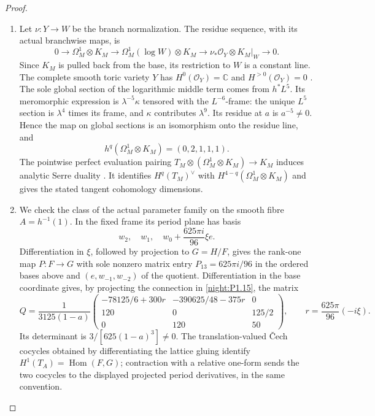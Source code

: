 \documentclass[11pt,a4paper]{article}
\theoremstyle{definition}
\begin{document}
\begin{proof}
\begin{enumerate}[label=\arabic*.]
\item Let $\nu:Y\to W$ be the branch normalization.  The residue
sequence, with its actual branchwise maps, is
\[
0\longrightarrow\Omega^1_M\otimes K_M
\longrightarrow\Omega^1_M(\log W)\otimes K_M
\longrightarrow\nu_*\mathcal O_Y\otimes K_M|_W
\longrightarrow0.
\]
Since $K_M$ is pulled back from the base, its restriction to $W$ is
a constant line.  The complete smooth toric variety $Y$ has
$H^0(\mathcal O_Y)=\mathbb C$ and $H^{>0}(\mathcal O_Y)=0$
\cite[Theorem~9.2.3, p.~410, with divisor zero]{CoxLittleSchenck2011}.
The sole global section of the logarithmic middle term comes from
$h^*L^5$.  Its meromorphic expression is
$\lambda^{-5}\kappa$ tensored with the $L^{-6}$-frame: the
unique $L^5$ section is $\lambda^4$ times its frame, and
$\kappa$ contributes $\lambda^9$.  Its residue at $a$ is
$a^{-5}\ne0$.  Hence the map on global sections is an isomorphism
onto the residue line, and
\[
h^q(\Omega^1_M\otimes K_M)=(0,2,1,1,1).
\]
The pointwise perfect evaluation pairing
$T_M\otimes(\Omega^1_M\otimes K_M)\to K_M$ induces analytic
Serre duality
\cite[\S13, Theorem~4, p.~22; \S15, p.~23]{Serre1955Duality}.
It identifies $H^q(T_M)^\vee$ with
$H^{4-q}(\Omega^1_M\otimes K_M)$ and gives the stated tangent
cohomology dimensions.

\item We check the class of the actual parameter family on the
smooth fibre $A=h^{-1}(1)$.  In the fixed frame its period plane
has basis
\[
w_2,\quad w_1,\quad w_0+\frac{625\pi i}{96}\xi e.
\]
Differentiation in $\xi$, followed by projection to $G=H/F$,
gives the rank-one map $P:F\to G$ with sole nonzero matrix entry
$P_{13}=625\pi i/96$ in the ordered bases above and
$(e,w_{-1},w_{-2})$ of the quotient.
Differentiation in the base coordinate gives, by projecting the
connection in \cref{night:P1.15}, the matrix
\[
Q=\frac1{3125(1-a)}
\begin{pmatrix}
-78125/6+300r&-390625/48-375r&0\\
120&0&125/2\\
0&120&50
\end{pmatrix},
\qquad r=\frac{625\pi}{96}(-i\xi).
\]
Its determinant is $3/[625(1-a)^3]\ne0$.
The translation-valued \v Cech cocycles obtained by differentiating
the lattice gluing identify
$H^1(T_A)=\operatorname{Hom}(F,G)$; contraction with a relative
one-form sends the two cocycles to the displayed projected period
derivatives, in the same convention.


\end{enumerate}
\end{proof}
\end{document}
